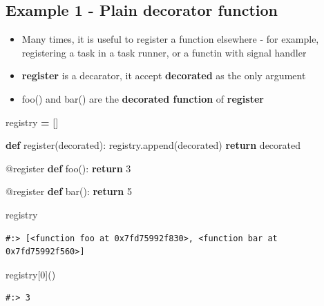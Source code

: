 \documentclass[
]{book}
\newenvironment{Shaded}{\begin{snugshade}}{\end{snugshade}}
\newcommand{\AttributeTok}[1]{\textcolor[rgb]{0.61,0.61,0.61}{#1}}
\newcommand{\ControlFlowTok}[1]{\textcolor[rgb]{0.27,0.27,0.27}{\textbf{#1}}}
\newcommand{\DecValTok}[1]{\textcolor[rgb]{0.06,0.06,0.06}{#1}}
\newcommand{\KeywordTok}[1]{\textcolor[rgb]{0.27,0.27,0.27}{\textbf{#1}}}
\newcommand{\NormalTok}[1]{#1}
\newcommand{\OperatorTok}[1]{\textcolor[rgb]{0.43,0.43,0.43}{\textbf{#1}}}
\providecommand{\tightlist}{%
  \setlength{\itemsep}{0pt}\setlength{\parskip}{0pt}}
\begin{document}
\hypertarget{example-1---plain-decorator-function}{%
\subsection{Example 1 - Plain decorator function}\label{example-1---plain-decorator-function}}

\begin{itemize}
\tightlist
\item
  Many times, it is useful to register a function elsewhere - for example, registering a task in a task runner, or a functin with signal handler
\item
  \textbf{register} is a decarator, it accept \textbf{decorated} as the only argument
\item
  foo() and bar() are the \textbf{decorated function} of \textbf{register}
\end{itemize}

\begin{Shaded}
\begin{Highlighting}[]
\NormalTok{registry }\OperatorTok{=}\NormalTok{ []}

\KeywordTok{def}\NormalTok{ register(decorated):}
\NormalTok{    registry.append(decorated)}
    \ControlFlowTok{return}\NormalTok{ decorated}

\AttributeTok{@register}
\KeywordTok{def}\NormalTok{ foo():}
    \ControlFlowTok{return} \DecValTok{3}

\AttributeTok{@register}
\KeywordTok{def}\NormalTok{ bar():}
    \ControlFlowTok{return} \DecValTok{5}
\end{Highlighting}
\end{Shaded}

\begin{Shaded}
\begin{Highlighting}[]
\NormalTok{registry}
\end{Highlighting}
\end{Shaded}

\begin{verbatim}
#:> [<function foo at 0x7fd75992f830>, <function bar at 0x7fd75992f560>]
\end{verbatim}

\begin{Shaded}
\begin{Highlighting}[]
\NormalTok{registry[}\DecValTok{0}\NormalTok{]()}
\end{Highlighting}
\end{Shaded}

\begin{verbatim}
#:> 3
\end{verbatim}
\end{document}
